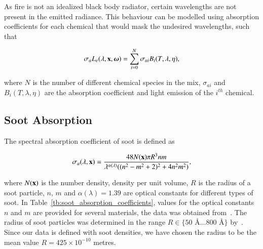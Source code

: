 As fire is not an idealized black body radiator, certain wavelengths are not present in the emitted radiance.
This behaviour can be modelled using absorption coefficients for each chemical that would mask the undesired wavelengths, such that

\begin{equation}
\sigma_a L_e(\lambda, \mathbf{x}, \boldsymbol{\omega}) = \sum_{i = 0}^N \sigma_{ai} B_i(T, \lambda, \eta),
\end{equation}

where $N$ is the number of different chemical species in the mix, $\sigma_{ai}$ and $B_i(T, \lambda, \eta)$ are the absorption coefficient and light emission of the $i^{th}$ chemical.

\subsection{Soot Absorption}
\label{sec:soot_absorption}

The spectral absorption coefficient of soot is defined as

\begin{equation}
\sigma_a(\lambda, \mathbf{x}) = \frac{48 N(\mathbf{x}) \pi R^3 n m}{\lambda^{\alpha(\lambda)} ((n^2 - m^2 +2)^2 + 4 n^2 m^2)},
\end{equation}

where $N(\mathbf{x})$ is the number density, density per unit volume, $R$ is the radius of a soot particle, $n$, $m$ and $\alpha(\lambda) = 1.39$ are optical constants for different types of soot.
In Table~\ref{tb:soot_absorption_coefficients}, values for the optical constants $n$ and $m$ are provided for several materials, the data was obtained from~\cite{Dalzell:1969}.
The radius of soot particles was determined in the range $R \in \lbrace 50\mbox{~\AA} \ldots 800\mbox{~\AA} \rbrace $ by~\cite{Dalzell:1969}.
Since our data is defined with soot densities, we have chosen the radius to be the mean value $R = 425 \times 10^{-10}$ metres.

